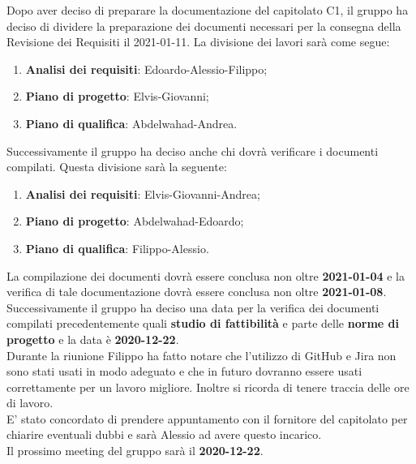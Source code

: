 Dopo aver deciso di preparare la documentazione del capitolato C1, il gruppo ha deciso di dividere la preparazione dei documenti necessari per la consegna della Revisione dei Requisiti il 2021-01-11. La divisione dei lavori sarà come segue:
\begin{enumerate}
\item \textbf{Analisi dei requisiti}: Edoardo-Alessio-Filippo;
\item \textbf{Piano di progetto}: Elvis-Giovanni;
\item \textbf{Piano di qualifica}: Abdelwahad-Andrea.
\end{enumerate}
Successivamente il gruppo ha deciso anche chi dovrà verificare i documenti compilati. Questa divisione sarà la seguente:
\begin{enumerate}
\item \textbf{Analisi dei requisiti}: Elvis-Giovanni-Andrea;
\item \textbf{Piano di progetto}: Abdelwahad-Edoardo;
\item \textbf{Piano di qualifica}: Filippo-Alessio.
\end{enumerate}
La compilazione dei documenti dovrà essere conclusa non oltre \textbf{2021-01-04} e la verifica di tale documentazione dovrà essere conclusa non oltre  \textbf{2021-01-08}.\\
Successivamente il gruppo ha deciso una data per la verifica dei documenti compilati precedentemente quali \textbf{studio di fattibilità} e parte delle \textbf{norme di progetto} e la data è \textbf{2020-12-22}.\\
Durante la riunione Filippo ha fatto notare che l'utilizzo di GitHub e Jira non sono stati usati in modo adeguato e che in futuro dovranno essere usati correttamente per un lavoro migliore. Inoltre si ricorda di tenere traccia delle ore di lavoro. \\
E' stato concordato di prendere appuntamento con il fornitore del capitolato per chiarire eventuali dubbi e sarà Alessio ad avere questo incarico. \\ 
Il prossimo meeting del gruppo sarà il \textbf{2020-12-22}.


